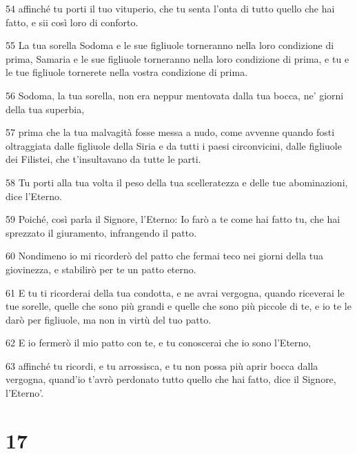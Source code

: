 \par 54 affinché tu porti il tuo vituperio, che tu senta l'onta di tutto quello che hai fatto, e sii così loro di conforto.
\par 55 La tua sorella Sodoma e le sue figliuole torneranno nella loro condizione di prima, Samaria e le sue figliuole torneranno nella loro condizione di prima, e tu e le tue figliuole tornerete nella vostra condizione di prima.
\par 56 Sodoma, la tua sorella, non era neppur mentovata dalla tua bocca, ne' giorni della tua superbia,
\par 57 prima che la tua malvagità fosse messa a nudo, come avvenne quando fosti oltraggiata dalle figliuole della Siria e da tutti i paesi circonvicini, dalle figliuole dei Filistei, che t'insultavano da tutte le parti.
\par 58 Tu porti alla tua volta il peso della tua scelleratezza e delle tue abominazioni, dice l'Eterno.
\par 59 Poiché, così parla il Signore, l'Eterno: Io farò a te come hai fatto tu, che hai sprezzato il giuramento, infrangendo il patto.
\par 60 Nondimeno io mi ricorderò del patto che fermai teco nei giorni della tua giovinezza, e stabilirò per te un patto eterno.
\par 61 E tu ti ricorderai della tua condotta, e ne avrai vergogna, quando riceverai le tue sorelle, quelle che sono più grandi e quelle che sono più piccole di te, e io te le darò per figliuole, ma non in virtù del tuo patto.
\par 62 E io fermerò il mio patto con te, e tu conoscerai che io sono l'Eterno,
\par 63 affinché tu ricordi, e tu arrossisca, e tu non possa più aprir bocca dalla vergogna, quand'io t'avrò perdonato tutto quello che hai fatto, dice il Signore, l'Eterno'.

\chapter{17}

